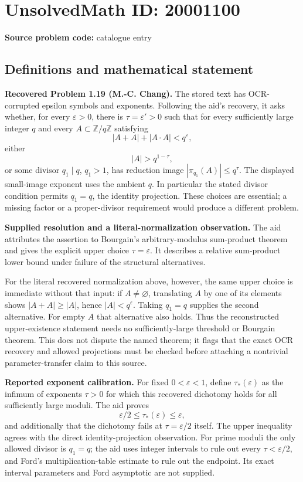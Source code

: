 \documentclass[11pt]{article}
\newcommand{\Z}{\mathbb{Z}}
\begin{document}
\section*{UnsolvedMath ID: 20001100}
\textbf{Source problem code:} catalogue entry
\subsection{Definitions and mathematical statement}
\textbf{Recovered Problem 1.19 (M.-C. Chang).} The stored text has OCR-corrupted epsilon symbols and exponents. Following the aid's recovery, it asks whether, for every $\varepsilon>0$, there is $\tau=\varepsilon'>0$ such that for every sufficiently large integer $q$ and every $A\subset\Z/q\Z$ satisfying
\[
 |A+A|+|A\cdot A|<q^\varepsilon,
\]
either
\[
 |A|>q^{1-\tau},
\]
or some divisor $q_1\mid q$, $q_1>1$, has reduction image $|\pi_{q_1}(A)|\leq q^\tau$. The displayed small-image exponent uses the ambient $q$. In particular the stated divisor condition permits $q_1=q$, the identity projection. These choices are essential; a missing factor or a proper-divisor requirement would produce a different problem.

\textbf{Supplied resolution and a literal-normalization observation.} The aid attributes the assertion to Bourgain's arbitrary-modulus sum-product theorem and gives the explicit upper choice $\tau=\varepsilon$. It describes a relative sum-product lower bound under failure of the structural alternatives.

For the literal recovered normalization above, however, the same upper choice is immediate without that input: if $A\ne\varnothing$, translating $A$ by one of its elements shows $|A+A|\geq|A|$, hence $|A|<q^\varepsilon$. Taking $q_1=q$ supplies the second alternative. For empty $A$ that alternative also holds. Thus the reconstructed upper-existence statement needs no sufficiently-large threshold or Bourgain theorem. This does not dispute the named theorem; it flags that the exact OCR recovery and allowed projections must be checked before attaching a nontrivial parameter-transfer claim to this source.

\textbf{Reported exponent calibration.} For fixed $0<\varepsilon<1$, define $\tau_*(\varepsilon)$ as the infimum of exponents $\tau>0$ for which this recovered dichotomy holds for all sufficiently large moduli. The aid proves
\[
 \varepsilon/2\leq\tau_*(\varepsilon)\leq\varepsilon,
\]
and additionally that the dichotomy fails at $\tau=\varepsilon/2$ itself. The upper inequality agrees with the direct identity-projection observation. For prime moduli the only allowed divisor is $q_1=q$; the aid uses integer intervals to rule out every $\tau<\varepsilon/2$, and Ford's multiplication-table estimate to rule out the endpoint. Its exact interval parameters and Ford asymptotic are not supplied.
\end{document}

